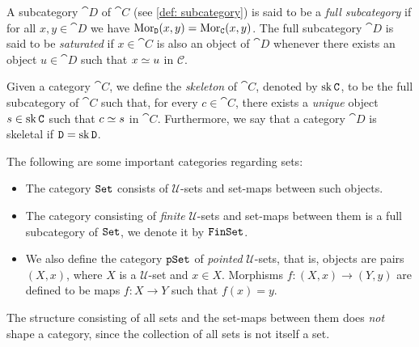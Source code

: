 \begin{definition}\label{def: full subcategory}
    A subcategory \(\cat D\) of \(\cat C\) (see \cref{def: subcategory}) is said to
    be a \emph{full subcategory} if for all \(x, y \in \cat D\) we have
    \(\operatorname{Mor}_{\texttt D}(x, y) = \operatorname{Mor}_{\texttt C}(x, y)\). The full subcategory \(\cat D\)
    is said to be \emph{saturated} if \(x \in \cat C\) is also an object of \(\cat D\)
    whenever there exists an object \(u \in \cat D\) such that \(x \simeq u\) in
    \(\mathcal C\).
\end{definition}

\begin{definition}[Skeleton]
    \label{def:skeleton-category}
    Given a category \(\cat C\), we define the \emph{skeleton} of \(\cat C\),
    denoted by \(\operatorname{sk} \texttt C\), to be the full subcategory of \(\cat C\) such that,
    for every \(c \in \cat C\), there exists a \emph{unique} object
    \(s \in \operatorname{sk} \texttt C\) such that \(c \simeq s\) in \(\cat C\). Furthermore, we say
    that a category \(\cat D\) is skeletal if \(\texttt D = \operatorname{sk} \texttt D\).
\end{definition}

\begin{example}
    \label{exp:set-based-categories}
    The following are some important categories regarding sets:
    \begin{itemize}\setlength\itemsep{0em}
        \item The category \({\texttt{Set}}\) consists of \(\mathcal U\)-sets and set-maps between
              such objects.
        \item The category consisting of \emph{finite} \(\mathcal U\)-sets and set-maps
              between them is a full subcategory of \({\texttt{Set}}\), we denote it by \({\texttt{FinSet}}\).
        \item We also define the category \({\texttt{pSet}}\) of \emph{pointed} \(\mathcal
              U\)-sets, that is, objects are pairs \((X, x)\), where \(X\) is a \(\mathcal
              U\)-set and \(x \in X\). Morphisms \(f: (X, x) \to (Y, y)\) are defined to be
              maps \(f: X \to Y\) such that \(f(x) = y\).
    \end{itemize}
\end{example}

\begin{remark}
    The structure consisting of all sets and the set-maps between them does
    \emph{not} shape a category, since the collection of all sets is not itself a
    set.
\end{remark}

